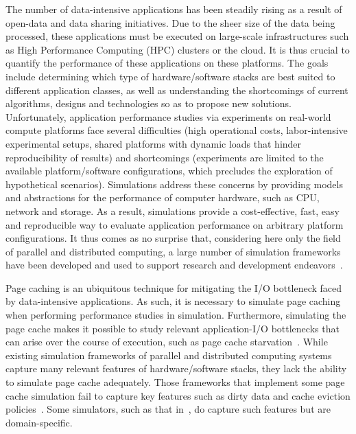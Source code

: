 \documentclass[conference]{IEEEtran}
\begin{document}
        The number of data-intensive applications has been steadily rising as a result of
        open-data and data sharing initiatives. Due to the sheer size of the data being
        processed, these applications must be executed on large-scale infrastructures
    such as High Performance Computing (HPC) clusters or the cloud.  It
    is thus crucial to quantify the performance of these applications
    on these platforms. The goals include determining which type of hardware/software
    stacks are best suited to different application classes, as well as
    understanding the shortcomings of current algorithms, designs and
    technologies so as to propose new solutions. Unfortunately, application performance
        studies via experiments on real-world compute platforms
        face several difficulties (high operational costs, labor-intensive experimental setups,
        shared platforms with dynamic loads that hinder reproducibility of results) and shortcomings
        (experiments are limited to the available platform/software configurations, which precludes
        the exploration of hypothetical scenarios). 
    Simulations address these concerns by providing models
    and abstractions for the performance of computer hardware, such as
    CPU, network and storage. As a result, simulations provide a
    cost-effective, fast, easy and reproducible way to evaluate
    application performance on arbitrary platform configurations. It thus comes
        as no surprise that, considering here only the field of parallel and distributed
        computing, a large number of simulation frameworks have been developed and used
        to support research and development endeavors~\cite{ optorsim, gridsim, groudsim, cloudsim, nunez2012simcan,nunez2012icancloud, mdcsim, dissect_cf, cloudnetsimplusplus, fognetsimplusplus, casanova2014simgrid, ROSS, casanova2020fgcs}. 


        Page caching is an ubiquitous technique for mitigating the I/O bottleneck
        faced by data-intensive applications. As such, it is necessary to simulate page caching
        when performing performance studies in simulation.
        Furthermore, simulating the page cache makes it possible to study relevant application-I/O
        bottlenecks that can arise over the course of execution, such as page cache
        starvation~\cite{zhuang2017}.
        While existing simulation frameworks of parallel and distributed computing
        systems  capture many relevant features of hardware/software stacks, 
        they lack the ability to simulate page cache adequately. Those frameworks
        that implement some page cache simulation
        fail to capture key features such
        as dirty data and cache eviction policies~\cite{nunez2012simcan,nunez2012icancloud}. 
        Some simulators, such as that in~\cite{xu2018saving}, do capture such features
        but are domain-specific. 
\end{document}
